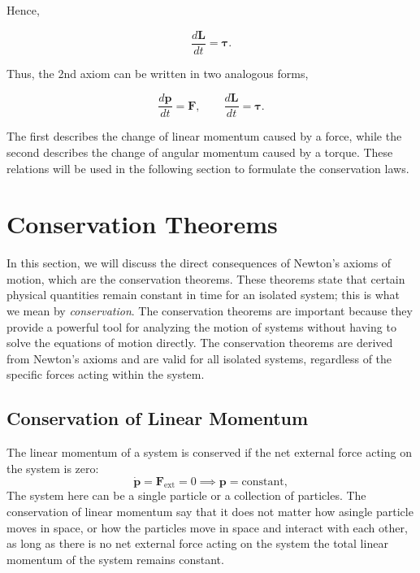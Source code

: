 \documentclass[../main.tex]{subfiles}
\begin{document}
Hence,

\begin{equation}
\boxed{
\frac{d\mathbf{L}}{dt}
= \boldsymbol{\tau}
}.
\end{equation}

Thus, the 2nd axiom can be written in two analogous forms,

\begin{equation}
\boxed{\frac{d\mathbf{p}}{dt}=\mathbf{F}},
\qquad
\boxed{\frac{d\mathbf{L}}{dt}=\boldsymbol{\tau}}.
\end{equation}

The first describes the change of linear momentum caused by a force,
while the second describes the change of angular momentum caused by a
torque. These relations will be used in the following section to
formulate the conservation laws.


\section{Conservation Theorems}
In this section, we will discuss the direct consequences of Newton's axioms of motion, which are the conservation theorems. These theorems state that certain physical quantities remain constant in time for an isolated system; this is what we mean by \emph{conservation}. The conservation theorems are important because they provide a powerful tool for analyzing the motion of systems without having to solve the equations of motion directly. The conservation theorems are derived from Newton's axioms and are valid for all isolated systems, regardless of the specific forces acting within the system.

\subsection{Conservation of Linear Momentum}
The linear momentum of a system is conserved if the net external force acting on the system is zero:
\begin{equation}
    \dot{\mathbf{p}} = \mathbf{F}_{\text{ext}} = 0 \implies \mathbf{p} = \text{constant},
\end{equation}
The system here can be a single particle or a collection of particles. The conservation of linear momentum say that it does not matter how asingle particle moves in space, or how the particles move in space and interact with each other, as long as there is no net external force acting on the system the total linear momentum of the system remains constant. 
\end{document}
